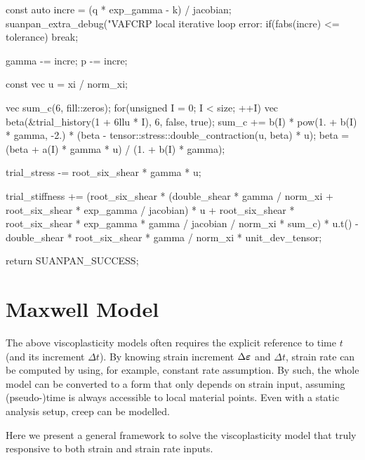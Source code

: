 \begin{cppcode}
{{        const auto incre = (q * exp_gamma - k) / jacobian;
        suanpan_extra_debug("VAFCRP local iterative loop error: %
        if(fabs(incre) <= tolerance) break;

        gamma -= incre;
        p -= incre;
    }

    const vec u = xi / norm_xi;

    vec sum_c(6, fill::zeros);
    for(unsigned I = 0; I < size; ++I) {
        vec beta(&trial_history(1 + 6llu * I), 6, false, true);
        sum_c += b(I) * pow(1. + b(I) * gamma, -2.) * (beta - tensor::stress::double_contraction(u, beta) * u);
        beta = (beta + a(I) * gamma * u) / (1. + b(I) * gamma);
    }

    trial_stress -= root_six_shear * gamma * u;

    trial_stiffness += (root_six_shear * (double_shear * gamma / norm_xi + root_six_shear * exp_gamma / jacobian) * u + root_six_shear * root_six_shear * exp_gamma * gamma / jacobian / norm_xi * sum_c) * u.t() - double_shear * root_six_shear * gamma / norm_xi * unit_dev_tensor;

    return SUANPAN_SUCCESS;
}
\end{cppcode}
\section{Maxwell Model}
The above viscoplasticity models often requires the explicit reference to time $t$ (and its increment $\Delta{}t$). By knowing strain increment $\Delta{}\bm{\varepsilon}$ and $\Delta{}t$, strain rate can be computed by using, for example, constant rate assumption. By such, the whole model can be converted to a form that only depends on strain input, assuming (pseudo-)time is always accessible to local material points. Even with a static analysis setup, creep can be modelled.

Here we present a general framework \cite{Chang2022a} to solve the viscoplasticity model that truly responsive to both strain and strain rate inputs.
